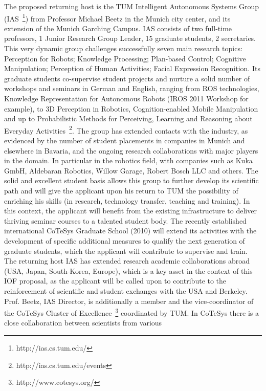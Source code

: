 The proposed returning host  is the TUM Intelligent Autonomous Systems
Group (IAS~\footnote{http://ias.cs.tum.edu/}) from Professor Michael  
Beetz in the Munich city center, and its extension of the Munich Garching 
Campus. IAS consists of two  full-time   professors,  1  Junior  
Research   Group  Leader,  15 graduate  students, 2  secretaries.  This  very dynamic  group challenges
successfully  seven  main  research  topics: Perception  for  Robots;
Knowledge Processing; Plan-based Control; Cognitive Manipulation; 
Perception of  Human Activities; Facial Expression Recognition.
Its graduate  students co-supervise student projects and  nurture a solid
number of workshops  and seminars in German and  English, ranging from
ROS technologies, Knowledge Representation for Autonomous Robots (IROS
2011   Workshop  for   example),   to  3D   Perception  in   Robotics,
Cognition-enabled Mobile Manipulation  and up to Probabilistic Methods
for Perceiving, Learning and Reasoning about Everyday Activities~\footnote{http://ias.cs.tum.edu/events}. 
The group has  extended contacts  with the industry,  as evidenced  by the
number of student  placements in companies in Munich  and elsewhere in
Bavaria, and the ongoing research collaborations with major players in
the domain. In particular  in the robotics field,  with companies
such  as Kuka  GmbH, Aldebaran  Robotics, Willow Garage, Robert Bosch LLC  
and others.   The solid  and excellent  student basis  allows  this group  
to  further develop  its scientific path and  will give the applicant upon 
his return  to TUM the possibility of enriching his skills (in research, 
technology transfer, teaching and training).  In  this  context,   the applicant  
will  benefit  from  the  existing infrastructure  to  deliver thriving  
seminar  courses  to a  talented
student body. The  recently established international CoTeSys Graduate
School  (2010) will  extend  its activities  with  the development  of
specific  additional  measures  to  qualify  the  next  generation  of
graduate students, which  the applicant will contribute to supervise  and train.  The
returning  host  IAS has  extended  research academic  collaborations
abroad (USA, Japan, South-Korea, Europe),  which is a key asset in the
context of this  IOF proposal, as the applicant will be  called upon to contribute
to the reinforcement of scientific  and student exchanges with the USA
and Berkeley.
Prof.  Beetz,  IAS  Director,   is  additionally  a  member  and  the
vice-coordinator of the CoTeSys  Cluster of Excellence~\footnote{http://www.cotesys.org/} 
coordinated by TUM.  In CoTeSys there is a  close collaboration  between  scientists from  various
